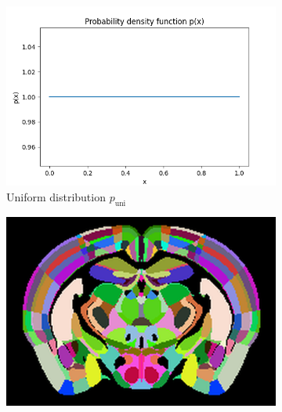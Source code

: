 \documentclass[]{article}
\begin{document}
\begin{figure}
		
	\begin{subfigure}{0.3\textwidth}
		\centering
		\includegraphics[width=1.1\linewidth]{plotted_figures/random_density_function.png}
		\caption{Uniform distribution $p_\text{uni}$}
		\label{fig:random_distribution}
	\end{subfigure}
	\begin{subfigure}{0.3\textwidth}
		\centering
		\includegraphics[width=0.95\linewidth]{../results/random_ano_coronal_50_res_slice_1.png}
		\caption{}
	\end{subfigure}
	\begin{subfigure}{0.3\textwidth}
		\centering

\end{subfigure}
\end{figure}
\end{document}
